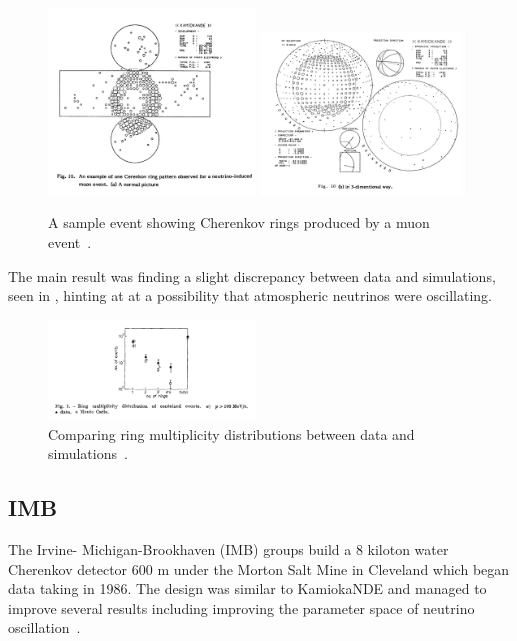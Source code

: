 \begin{figure}[h!]
\centering
  \centering
\includegraphics[width=0.49\textwidth]{figures/Kamioka2.jpeg}
\includegraphics[width=0.49\textwidth]{figures/Kamioka3.jpeg}
\vspace{2mm}
\caption{A sample event showing Cherenkov rings produced by a muon event~\cite{58KAMIOKA}.}
\label{fig:Kam2}
\end{figure}
The main result was finding a slight discrepancy between data and simulations, seen in , hinting at at a possibility that atmospheric neutrinos were oscillating.
\begin{figure}[h!]
\centering
  \centering
\includegraphics[width=0.49\textwidth]{figures/Kamioka4.jpeg}
\vspace{2mm}
\caption{Comparing ring multiplicity distributions between data and simulations~\cite{59KAMIOKA}.}
\label{fig:Kam3}
\end{figure}

\subsection{IMB}
The Irvine- Michigan-Brookhaven (IMB) groups build a 8 kiloton water Cherenkov detector 600 m under the Morton Salt Mine in Cleveland which began data taking in 1986. The design was similar to KamiokaNDE and managed to improve several results including improving the parameter space of neutrino oscillation~\cite{60IMB}.


